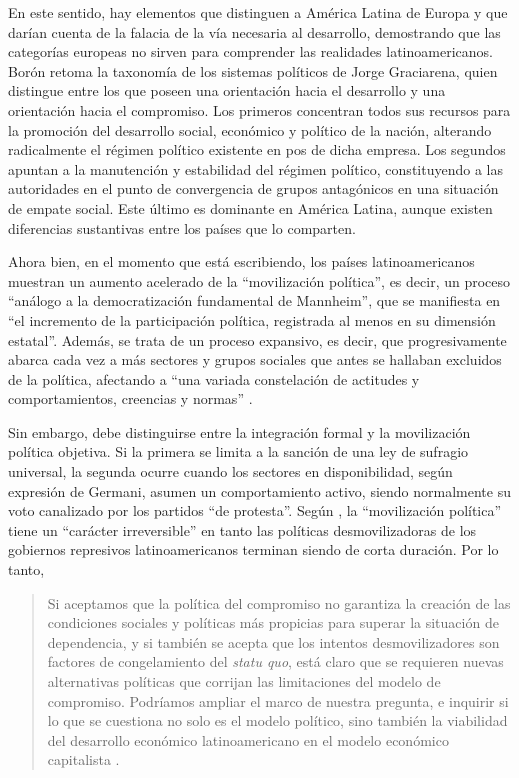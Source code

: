 En este sentido, hay elementos que distinguen a América Latina de Europa y que darían cuenta de la falacia de la vía necesaria al desarrollo, demostrando que las categorías europeas no sirven para comprender las realidades latinoamericanos. Borón retoma la taxonomía de los sistemas políticos de Jorge Graciarena, quien distingue entre los que poseen una orientación hacia el desarrollo y una orientación hacia el compromiso. Los primeros concentran todos sus recursos para la promoción del desarrollo social, económico y político de la nación, alterando radicalmente el régimen político existente en pos de dicha empresa. Los segundos apuntan a la manutención y estabilidad del régimen político, constituyendo a las autoridades en el punto de convergencia de grupos antagónicos en una situación de empate social. Este último es dominante en América Latina, aunque existen diferencias sustantivas entre los países que lo comparten.

Ahora bien, en el momento que \textcite[115]{1569-BORON2020} está escribiendo, los países latinoamericanos muestran un aumento acelerado de la \enquote{movilización política}, es decir, un proceso \enquote{análogo a la democratización fundamental de Mannheim}, que se manifiesta en \enquote{el incremento de la participación política, registrada al menos en su dimensión estatal}. Además, se trata de un proceso expansivo, es decir, que progresivamente abarca cada vez a más sectores y grupos sociales que antes se hallaban excluidos de la política, afectando a \enquote{una variada constelación de actitudes y comportamientos, creencias y normas} \parencite[116]{1569-BORON2020}.

Sin embargo, debe distinguirse entre la integración formal y la movilización política objetiva. Si la primera se limita a la sanción de una ley de sufragio universal, la segunda ocurre cuando los sectores en disponibilidad, según expresión de Germani, asumen un comportamiento activo, siendo normalmente su voto canalizado por los partidos \enquote{de protesta}. Según \textcite[118]{1569-BORON2020}, la \enquote{movilización política} tiene un \enquote{carácter irreversible} en tanto las políticas desmovilizadoras de los gobiernos represivos latinoamericanos terminan siendo de corta duración. Por lo tanto,

\begin{quote}
Si aceptamos que la política del compromiso no garantiza la creación de las condiciones sociales y políticas más propicias para superar la situación de dependencia, y si también se acepta que los intentos desmovilizadores son factores de congelamiento del \emph{statu quo}, está claro que se requieren nuevas alternativas políticas que corrijan las limitaciones del modelo de compromiso. Podríamos ampliar el marco de nuestra pregunta, e inquirir si lo que se cuestiona no solo es el modelo político, sino también la viabilidad del desarrollo económico latinoamericano en el modelo económico capitalista \parencite[119]{1569-BORON2020}.
\end{quote}


